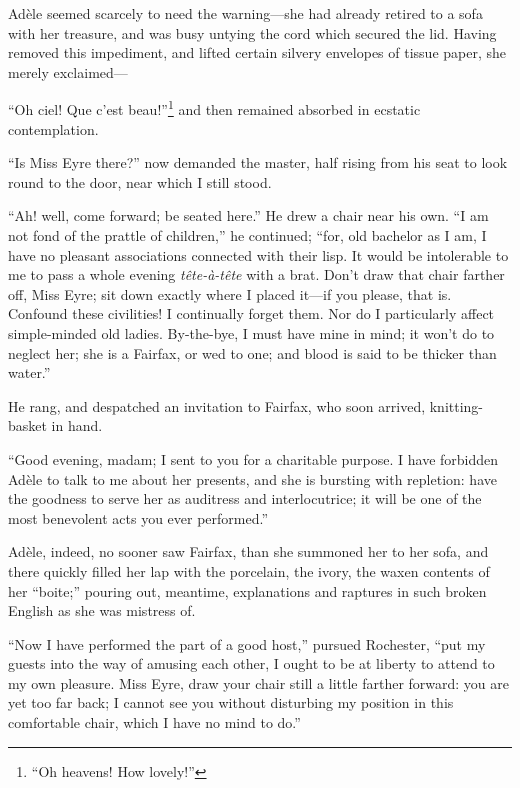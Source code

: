 Adèle seemed scarcely to need the warning---she had already retired to a
sofa with her treasure, and was busy untying the cord which secured the
lid. Having removed this impediment, and lifted certain silvery
envelopes of tissue paper, she merely exclaimed---

\foreignquote{french}{Oh ciel! Que c'est beau!}\footnote{\enquote{Oh heavens! How lovely!}} and then remained absorbed in
ecstatic contemplation.

\enquote{Is Miss Eyre there?} now demanded the master, half rising from
his seat to look round to the door, near which I still stood.

\enquote{Ah! well, come forward; be seated here.} He drew a chair near
his own. \enquote{I am not fond of the prattle of children,} he
continued; \enquote{for, old bachelor as I am, I have no pleasant associations
connected with their lisp. It would be intolerable to me to pass a
whole evening \emph{tête-à-tête} with a brat. Don't draw that chair
farther off, Miss Eyre; sit down exactly where I placed it---if you
please, that is. Confound these civilities! I continually forget
them. Nor do I particularly affect simple-minded old ladies. 
By-the-bye, I must have mine in mind; it won't do to neglect her; she is
a Fairfax, or wed to one; and blood is said to be thicker than water.}

He rang, and despatched an invitation to \Mrs{} Fairfax, who soon arrived,
knitting-basket in hand.

\enquote{Good evening, madam; I sent to you for a charitable purpose. I
have forbidden Adèle to talk to me about her presents, and she is
bursting with repletion: have the goodness to serve her as auditress and
interlocutrice; it will be one of the most benevolent acts you ever
performed.}

Adèle, indeed, no sooner saw \Mrs{} Fairfax, than she summoned her to her
sofa, and there quickly filled her lap with the porcelain, the ivory,
the waxen contents of her \foreignquote{french}{boite;} pouring out, meantime,
explanations and raptures in such broken English as she was mistress of.

\enquote{Now I have performed the part of a good host,} pursued \Mr{}
 Rochester, \enquote{put my guests into the way of amusing each other, I
ought to be at liberty to attend to my own pleasure. Miss Eyre, draw
your chair still a little farther forward: you are yet too far back; I
cannot see you without disturbing my position in this comfortable chair,
which I have no mind to do.}

